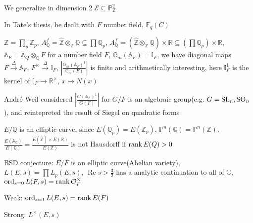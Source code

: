We generalize in dimension 2 $\mathcal E\subseteq\mathbb P^2_{\mathbb Z}$
\begin{center}
\end{center}

In Tate's thesis, he dealt with $F$ number field, $\mathbb F_q(C)$

$\mathbb Z=\prod_p\mathbb Z_p$, $A_{\mathbb Q}^f=\widehat{\mathbb Z}\otimes_{\mathbb Z}\mathbb Q\subseteq\prod\mathbb Q_p$, $A_{\mathbb Q}^f=(\widehat{\mathbb Z}\otimes_{\mathbb Z}\mathbb Q)\times\mathbb R\subseteq(\prod\mathbb Q_p)\times\mathbb R$, $\mathbb A_F=\mathbb A_Q\otimes_{\mathbb Q}F$ for a number field $F$, $\mathbb G_m(\mathbb A_F)=\mathbb I_F$, we have diagonal maps $F\xrightarrow{\Delta}\mathbb A_F$, $F^\times\xrightarrow{\Delta}\mathbb I_F$, $\left|\frac{\mathbb G_m(\mathbb A_F)^1}{\mathbb G_m(F)}\right|$ is finite and arithmetically interesting, here $\mathbb I_F^1$ is the kernel of $\mathbb I_F\to\mathbb R^\times$, $x\mapsto N(x)$

Andr\'e Weil considered $\left|\frac{G(\mathbb A_F)^1}{G(F)}\right|$ for $G/F$ is an algebraic group(e.g. $G=\operatorname{SL}_n,\operatorname{SO}_n$), and reintepreted the result of Siegel on quadratic forms

$E/\mathbb Q$ is an elliptic curve, since $E(\mathbb Q_p)=E(\mathbb Z_p)$, $\mathbb P^n(\mathbb Q)=\mathbb P^n(\mathbb Z)$, $\frac{E(\mathbb A_{\mathbb Q})}{E(\mathbb Q)}=\frac{E(\widehat{\mathbb Z})\times E(\mathbb R)}{E(\mathbb Z)}$ is not Hausdorff if $\operatorname{rank} E\mathbb (Q)>0$

BSD conjecture: $E/F$ is an elliptic curve(Abelian variety), $L(E,s)=\prod L_p(E,s)$, $\operatorname{Re}s>\frac{3}{2}$ has a analytic continuation to all of $\mathbb C$, $\operatorname{ord}_{s=0}L(F,s)=\operatorname{rank}\mathcal O_F^\times$

Weak: $\operatorname{ord}_{s=1}L(E,s)=\operatorname{rank} E(F)$

Strong: $L^\times(E,s)$
